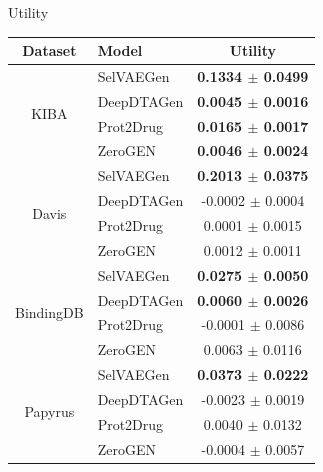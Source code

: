 \documentclass[10pt,aspectratio=43]{beamer}
\begin{document}
\begin{frame}[t]{Utility}
    \begin{table}
        \centering

        \small
        \begin{tabular}{clc}
            \toprule
            Dataset & Model
            & Utility \\
            \midrule

            \multirow{4}{*}{KIBA} & SelVAEGen
            & \textbf{0.1334 $\pm$ 0.0499} \\
            & DeepDTAGen
            & \textbf{0.0045 $\pm$ 0.0016} \\
            & Prot2Drug
            & \textbf{0.0165 $\pm$ 0.0017} \\
            & ZeroGEN
            & \textbf{0.0046 $\pm$ 0.0024} \\
            \midrule

            \multirow{4}{*}{Davis} & SelVAEGen
            & \textbf{0.2013 $\pm$ 0.0375} \\
            & DeepDTAGen
            & -0.0002 $\pm$ 0.0004 \\
            & Prot2Drug
            & 0.0001 $\pm$ 0.0015 \\
            & ZeroGEN
            & 0.0012 $\pm$ 0.0011 \\
            \midrule

            \multirow{4}{*}{BindingDB} & SelVAEGen
            & \textbf{0.0275 $\pm$ 0.0050} \\
            & DeepDTAGen
            & \textbf{0.0060 $\pm$ 0.0026} \\
            & Prot2Drug
            & -0.0001 $\pm$ 0.0086 \\
            & ZeroGEN
            & 0.0063 $\pm$ 0.0116 \\
            \midrule

            \multirow{4}{*}{Papyrus} & SelVAEGen
            & \textbf{0.0373 $\pm$ 0.0222} \\
            & DeepDTAGen
            & -0.0023 $\pm$ 0.0019 \\
            & Prot2Drug
            & 0.0040 $\pm$ 0.0132 \\
            & ZeroGEN
            & -0.0004 $\pm$ 0.0057 \\

            \bottomrule
        \end{tabular}
    \end{table}
\end{frame}
\end{document}
